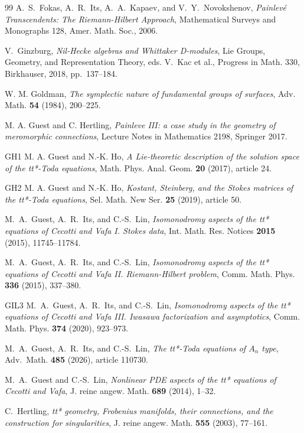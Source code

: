 \documentclass[a4paper,12pt,leqno]{amsart}
\numberwithin{equation}{section}
\theoremstyle{plain}
\theoremstyle{definition}
\begin{document}
\begin{thebibliography}{99}
A.~S.~Fokas, A.~R.~Its, A.~A.~Kapaev, and V.~Y.~Novokshenov,
\emph{Painlev\'e Transcendents: The Riemann-Hilbert Approach},
Mathematical Surveys and Monographs 128,
Amer. Math. Soc.,
2006.

V.~Ginzburg,
\emph{Nil-Hecke algebras and Whittaker D-modules},
Lie Groups, Geometry, and Representation Theory,
eds. V.~Kac et al.,
Progress in Math. 330,
Birkhauser,
2018,
pp.~137--184.

W. M. Goldman,
\emph{The symplectic nature of fundamental groups of surfaces},
Adv. Math.
\textbf{54} (1984), 200--225.

M. A. Guest and C. Hertling,
\emph{Painleve III:  a case study in the geometry of meromorphic connections},
Lecture Notes in Mathematics 2198,
Springer
2017.

\bibitem
{GH1}
M. A. Guest and N.-K. Ho,
\emph{A Lie-theoretic description of the solution space of the tt*-Toda equations},
Math. Phys. Anal. Geom.
\textbf{20}
(2017),
article 24.

\bibitem
{GH2}
M. A. Guest and N.-K. Ho,
\emph{Kostant, Steinberg, and the Stokes matrices of the tt*-Toda equations},
Sel. Math. New Ser.
\textbf{25}
(2019),
article 50.

M.~A.~Guest, A.~R.~Its, and C.-S.~Lin,
\emph{Isomonodromy aspects of the tt*
equations of Cecotti and Vafa I. Stokes data},
Int. Math. Res. Notices
\textbf{2015}
(2015),
11745--11784.

M.~A.~Guest, A.~R.~Its, and C.-S.~Lin,
\emph{Isomonodromy aspects of the tt*
equations of Cecotti and Vafa II. Riemann-Hilbert problem},
Comm. Math. Phys.
\textbf{336}
(2015),
337--380.

\bibitem
{GIL3}
M.~A.~Guest, A.~R.~Its, and C.-S.~Lin,
\emph{Isomonodromy aspects of the tt*
equations of Cecotti and Vafa
III.  Iwasawa factorization and asymptotics},
Comm. Math. Phys.
\textbf{374}
(2020),
923--973.

M.~A.~Guest, A.~R.~Its, and C.-S.~Lin,
\emph{The tt*-Toda
equations of $A_n$ type},
Adv.\ Math.
\textbf{485}
(2026),
article 110730.

M.~A.~Guest and C.-S.~Lin,
\emph{Nonlinear PDE aspects of the tt*
equations of Cecotti and Vafa},
J. reine angew. Math.
\textbf{689}
(2014),
1--32.

C.~Hertling,
\emph{tt* geometry, Frobenius manifolds, their connections,  and the construction for singularities},
J. reine angew. Math.
\textbf{555}
(2003),
77--161.


\end{thebibliography}
\end{document}
